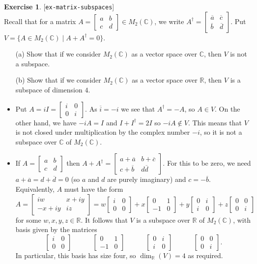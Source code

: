 \documentclass{amsart}
\newcommand{\R}         {{\mathbb{R}}}
\newcommand{\C}         {{\mathbb{C}}}
\newcommand{\bsm}       {\left[\begin{smallmatrix}}
\newcommand{\esm}       {\end{smallmatrix}\right]}
\newcommand{\ov}[1]     {\overline{#1}}
\newcommand{\st}        {\;|\;}
\renewcommand{\:}{\colon}
\newcommand{\lastexlabel}{}
\newcommand{\exlabel}[1]{
 \global\def\lastexlabel{#1}\label{#1}[\texttt{#1}]\ \\
}
\newcommand{\exlabel}[1]{
 \global\def\lastexlabel{#1}\label{#1}
}
\newenvironment{solution}{\SolutionInline}{\endSolutionInline}
\theoremstyle{definition}
\newtheorem{exercise}{Exercise}[section]
\renewenvironment{solution}{\SolutionAtEnd}{\endSolutionAtEnd}
\begin{document}
\begin{exercise}\exlabel{ex-matrix-subspaces}
 Recall that for a matrix $A=\bsm a&b\\ c&d\esm\in M_2(\C)$, we write 
 $A^\dag=\bsm\ov{a}&\ov{c} \\ \ov{b}&\ov{d}\esm$.  Put
 $V=\{A\in M_2(\C)\st A+A^\dag=0\}$.  
 \begin{itemize}
  \item[(a)] Show that if we consider $M_2(\C)$ as a vector space over
   $\C$, then $V$ is not a subspace.
  \item[(b)] Show that if we consider $M_2(\C)$ as a vector space over
   $\R$, then $V$ is a subspace of dimension $4$.
 \end{itemize}
\end{exercise}
\begin{solution}
 \begin{itemize}
  \item Put $A=iI=\bsm i&0\\ 0&i\esm$.  As $\ov{i}=-i$ we see that
   $A^\dag=-A$, so $A\in V$.  On the other hand, we have $-iA=I$ and
   $I+I^\dag=2I$ so $-iA\not\in V$.  This means that $V$ is not closed
   under multiplication by the complex number $-i$, so it is not a
   subspace over $\C$ of $M_2(\C)$.
  \item If $A=\bsm a&b\\ c&d\esm$ then
   $A+A^\dag=\bsm a+\ov{a} & b+\ov{c}\\ c+\ov{b} & d\ov{d}\esm$.  For
   this to be zero, we need $a+\ov{a}=d+\ov{d}=0$ (so $a$ and $d$ are
   purely imaginary) and $c=-\ov{b}$.  Equivalently, $A$ must have the
   form 
   \[ A=\bsm iw & x+iy \\ -x+iy & iz \esm = 
       w\bsm i&0\\0&0 \esm + 
       x\bsm 0&1\\-1&0\esm +
       y\bsm 0&i\\ i&0\esm +
       z\bsm 0&0\\ 0&i\esm
   \] 
   for some $w,x,y,z\in\R$.  It follows that $V$ is a subspace over
   $\R$ of $M_2(\C)$, with basis given by the matrices
   \[  \bsm i&0\\0&0 \esm \hspace{3em}
       \bsm 0&1\\-1&0\esm \hspace{3em}
       \bsm 0&i\\ i&0\esm \hspace{3em}
       \bsm 0&0\\ 0&i\esm.
   \]
   In particular, this basis has size four, so $\dim_\R(V)=4$ as
   required. 
 \end{itemize}
\end{solution}
\end{document}
